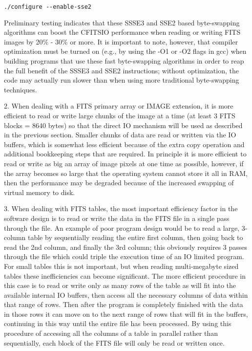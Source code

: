 \documentclass[11pt]{book}
\begin{document}
\begin{verbatim}
./configure --enable-sse2
\end{verbatim}
Preliminary testing indicates that these SSSE3 and SSE2 based
byte-swapping algorithms can boost the CFITSIO performance when
reading or writing FITS images by 20\% - 30\% or more.
It is important to note, however, that compiler optimization must be
turned on (e.g., by using the -O1 or -O2 flags in gcc) when building
programs that use these fast byte-swapping algorithms in order
to reap the full benefit of the SSSE3 and SSE2 instructions; without
optimization, the code may actually run slower than when using
more traditional byte-swapping techniques.

2.  When dealing with a FITS primary array or IMAGE extension, it is
more efficient to read or write large chunks of the  image at a time
(at least 3 FITS blocks = 8640 bytes) so that the direct IO mechanism
will be used as described in the previous section.  Smaller chunks of
data are read or written via the IO buffers, which is somewhat less
efficient because of the extra copy operation and additional
bookkeeping steps that are required.  In principle it is more efficient
to read or write as big an array of image pixels at one time as
possible, however, if the array becomes so large that the operating
system cannot store it all in RAM, then the performance may be degraded
because of the increased swapping of virtual memory to disk.

3.  When dealing with FITS tables, the most important efficiency factor
in the software design is to read or write the data in the FITS file in
a single pass through the file.  An example of poor program design
would be to read a large, 3-column table by sequentially reading the
entire first column, then going back to read the 2nd column, and
finally the 3rd column; this obviously requires 3 passes through the
file which could triple the execution time of an IO limited program.
For small tables this is not important, but when reading multi-megabyte
sized tables these inefficiencies can become significant.  The more
efficient procedure in this case is to read or write only as many rows
of the table as will fit into the available internal IO buffers, then
access all the necessary columns of data within that range of rows.
Then after the program is completely finished with the data in those
rows it can move on to the next range of rows that will fit in the
buffers, continuing in this way until the entire file has been
processed.  By using this procedure of accessing all the columns of a
table in parallel rather than sequentially, each block of the FITS file
will only be read or written once.
\end{document}
